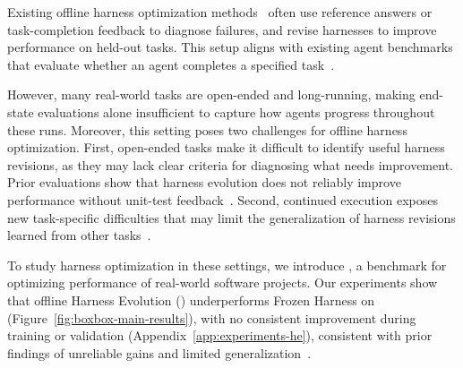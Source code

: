 
Existing offline harness optimization methods~\citep{park2026autosaddler,zhang2026selfharness,lin2026agentic,wang2026harnessevolution} often use reference answers or task-completion feedback to diagnose failures, and revise harnesses to improve performance on held-out tasks. This setup aligns with existing agent benchmarks that evaluate whether an agent completes a specified task~\citep{jimenez2024swebench,merrill2026terminalbench,froger2026gaia2}.

However, many real-world tasks are open-ended and long-running, making end-state evaluations alone insufficient to capture how agents progress throughout these runs.
%
Moreover, this setting poses two challenges for offline harness optimization. First, open-ended tasks make it difficult to identify useful harness revisions, as they may lack clear criteria for diagnosing what needs improvement. Prior evaluations show that harness evolution does not reliably improve performance without unit-test feedback~\citep{wang2026harnessevolution}. Second, continued execution exposes new task-specific difficulties that may limit the generalization of harness revisions learned from other tasks~\citep{nie2026tthe,wang2026harnessevolution}.



To study harness optimization in these settings, we introduce \perfrace{}, a benchmark for optimizing performance of real-world software projects. Our experiments show that offline Harness Evolution (\he{}) underperforms Frozen Harness on \perfrace{} (Figure~\ref{fig:boxbox-main-results}), with no consistent improvement during training or validation (Appendix~\ref{app:experiments-he}), consistent with prior findings of unreliable gains and limited generalization~\citep{wang2026harnessevolution}.


